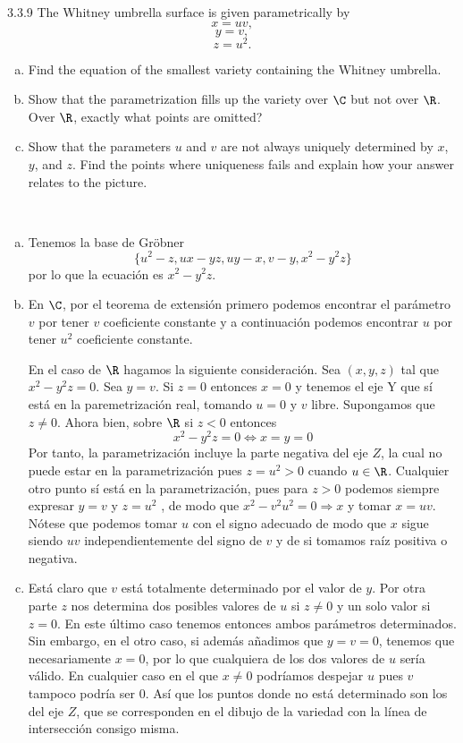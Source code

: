 \documentclass[twoside]{article}
\begin{document}
\begin{ejercicio}{3.3.9}
The Whitney umbrella surface is given parametrically by
\[x = uv,\]
\[y = v,\]
\[z = u^2.\]
\begin{enumerate}[a.]
\item Find the equation of the smallest variety containing the Whitney umbrella.
\item Show that the parametrization fills up the variety over $\C$ but not over $\R$. Over $\R$,
exactly what points are omitted?
\item Show that the parameters $u$ and $v$ are not always uniquely determined by $x$, $y$, and $z$.
Find the points where uniqueness fails and explain how your answer relates to the
picture.
\end{enumerate}
\end{ejercicio}
\begin{solucion}\
\begin{enumerate}[a.]
\item Tenemos la base de Gröbner 
\[
\{u^2 - z, ux - yz, uy - x, v - y, x^2 - y^2z\}
\]
por lo que la ecuación es $x^2-y^2z$. 
\item En $\C$, por el teorema de extensión primero podemos encontrar el parámetro $v$ por tener $v$ coeficiente constante y a continuación podemos encontrar $u$ por tener $u^2$ coeficiente constante. 

En el caso de $\R$ hagamos la siguiente consideración. Sea $(x,y,z)$ tal que $x^2-y^2z=0$. Sea $y=v$. Si $z=0$ entonces $x=0$ y tenemos el eje Y que sí está en la paremetrización real, tomando $u=0$ y $v$ libre. Supongamos que $z\neq 0$. Ahora bien, sobre $\R$ si $z<0$ entonces 
$$x^2-y^2z = 0 \Leftrightarrow x= y =0$$
Por tanto, la parametrización incluye la parte negativa del eje $Z$, la cual no puede estar en la parametrización pues $z=u^2>0$ cuando $u\in\R$. Cualquier otro punto sí está en la parametrización, pues para $z>0$ podemos siempre expresar $y=v$ y $z=u^2$ , de modo que $x^2-v^2u^2=0\Rightarrow x$ y tomar $x=uv$. Nótese que podemos tomar $u$ con el signo adecuado de modo que $x$ sigue siendo $uv$ independientemente del signo de $v$ y de si tomamos raíz positiva o negativa. 

\item Está claro que $v$ está totalmente determinado por el valor de $y$. Por otra parte $z$ nos determina dos posibles valores de $u$ si $z\neq 0$ y un solo valor si $z=0$. En este último caso tenemos entonces ambos parámetros determinados. Sin embargo, en el otro caso, si además añadimos que $y=v=0$, tenemos que necesariamente $x=0$, por lo que cualquiera de los dos valores de $u$ sería válido. En cualquier caso en el que $x\neq 0$ podríamos despejar $u$ pues $v$ tampoco podría ser 0. Así que los puntos donde no está determinado son los del eje $Z$, que se corresponden en el dibujo de la variedad con la línea de intersección consigo misma. 
\end{enumerate}
\end{solucion}
\end{document}
